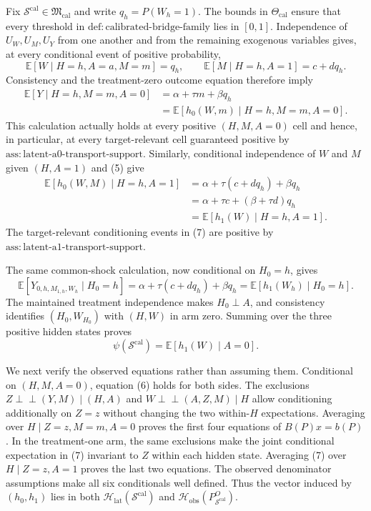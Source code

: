 Fix \(\mathcal S^{\mathrm{cal}}\in\mathfrak M_{\mathrm{cal}}\) and write
\(q_h=P(W_h=1)\).  The bounds in \(\Theta_{\mathrm{cal}}\) ensure that every
threshold in \(\mathrm{def{:}calibrated\text{-}bridge\text{-}family}\) lies in
\([0,1]\).  Independence of \(U_W,U_M,U_Y\) from one another and from the
remaining exogenous variables gives, at every conditional event of positive
probability,
\[
 \mathbb E[W\mid H=h,A=a,M=m]=q_h,
 \qquad
 \mathbb E[M\mid H=h,A=1]=c+dq_h.
 \tag{5}
\]
Consistency and the treatment-zero outcome equation therefore imply
\[
 \begin{aligned}
 \mathbb E[Y\mid H=h,M=m,A=0]
 &=\alpha+\tau m+\beta q_h\\
 &=\mathbb E[h_0(W,m)\mid H=h,M=m,A=0].
 \end{aligned}
 \tag{6}
\]
This calculation actually holds at every positive \((H,M,A=0)\) cell and hence,
in particular, at every target-relevant cell guaranteed positive by
\(\mathrm{ass{:}latent\text{-}a0\text{-}transport\text{-}support}\).  Similarly,
conditional independence of \(W\) and \(M\) given \((H,A=1)\) and (5) give
\[
 \begin{aligned}
 \mathbb E[h_0(W,M)\mid H=h,A=1]
 &=\alpha+\tau(c+dq_h)+\beta q_h\\
 &=\alpha+\tau c+(\beta+\tau d)q_h\\
 &=\mathbb E[h_1(W)\mid H=h,A=1].
 \end{aligned}
 \tag{7}
\]
The target-relevant conditioning events in (7) are positive by
\(\mathrm{ass{:}latent\text{-}a1\text{-}transport\text{-}support}\).

The same common-shock calculation, now conditional on \(H_0=h\), gives
\[
 \mathbb E[Y_{0,h,M_{1,h},W_h}\mid H_0=h]
 =\alpha+\tau(c+dq_h)+\beta q_h
 =\mathbb E[h_1(W_h)\mid H_0=h].
\]
The maintained treatment independence makes \(H_0\perp A\), and consistency
identifies \((H_0,W_{H_0})\) with \((H,W)\) in arm zero.  Summing over the three
positive hidden states proves
\[
 \psi(\mathcal S^{\mathrm{cal}})=\mathbb E[h_1(W)\mid A=0].
 \tag{8}
\]

We next verify the observed equations rather than assuming them.  Conditional on
\((H,M,A=0)\), equation (6) holds for both sides.  The exclusions
\(Z\mathbin{\perp\!\!\!\perp}(Y,M)\mid(H,A)\) and
\(W\mathbin{\perp\!\!\!\perp}(A,Z,M)\mid H\) allow conditioning additionally on
\(Z=z\) without changing the two within-\(H\) expectations.  Averaging over
\(H\mid Z=z,M=m,A=0\) proves the first four equations of
\(B(P)x=b(P)\).  In the treatment-one arm, the same exclusions make the joint
conditional expectation in (7) invariant to \(Z\) within each hidden state.
Averaging (7) over \(H\mid Z=z,A=1\) proves the last two equations.  The observed
denominator assumptions make all six conditionals well defined.  Thus the vector
induced by \((h_0,h_1)\) lies in both
\(\mathcal H_{\mathrm{lat}}(\mathcal S^{\mathrm{cal}})\) and
\(\mathcal H_{\mathrm{obs}}(P_{\mathcal S^{\mathrm{cal}}}^O)\).

